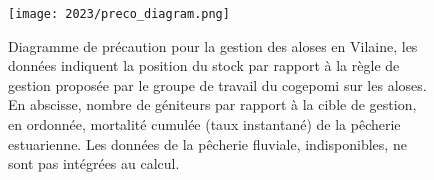 \documentclass[11pt,twocolumn,titlepage,twoside]{article}\usepackage[]{graphicx}\usepackage[]{color}
\begin{document}

\clearpage %
\begin{landscape}
\begin{figure}[htpb]
\centering
\texttt{[image: 2023/preco\_diagram.png]} 
\caption{Diagramme de précaution pour la gestion des aloses en Vilaine, 
les données indiquent la position du stock par rapport à la règle de gestion proposée 
par le groupe de travail du cogepomi sur les aloses. 
En abscisse, nombre de géniteurs par rapport à la cible de gestion, 
en ordonnée, mortalité cumulée (taux instantané) de la pêcherie estuarienne. 
Les données de la pêcherie fluviale, indisponibles, ne sont pas intégrées au
calcul.}
\label{preco_diagram}
\end{figure}
\end{landscape}



















\clearpage
\twocolumn
\end{document}
